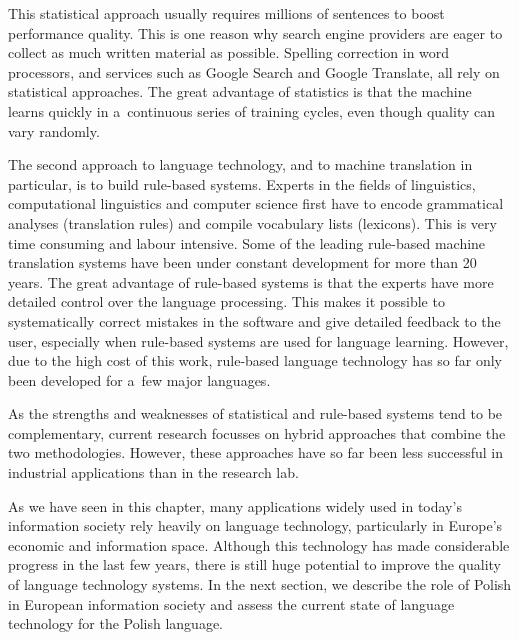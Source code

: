 \begin{multicols}{2}
This statistical approach usually requires millions of sentences to
boost performance quality. This is one reason why search engine
providers are eager to collect as much written material as possible.
Spelling correction in word processors, and services such as Google
Search and Google Translate, all rely on statistical approaches. The
great advantage of statistics is that the machine learns quickly in
a~continuous series of training cycles, even though quality can vary
randomly. 

The second approach to language technology, and to machine translation
in particular, is to build rule-based systems. Experts in the fields
of linguistics, computational linguistics and computer science first
have to encode grammatical analyses (translation rules) and compile
vocabulary lists (lexicons). This is very time consuming and labour
intensive. Some of the leading rule-based machine translation systems
have been under constant development for more than 20 years. The great
advantage of rule-based systems is that the experts have more detailed
control over the language processing. This makes it possible to
systematically correct mistakes in the software and give detailed
feedback to the user, especially when rule-based systems are used for
language learning. However, due to the high cost of this work,
rule-based language technology has so far only been developed for
a~few major languages. 


As the strengths and weaknesses of statistical and rule-based systems
tend to be complementary, current research focusses on hybrid
approaches that combine the two methodologies. However, these
approaches have so far been less successful in industrial applications
than in the research lab. 

As we have seen in this chapter, many applications widely used in
today’s information society rely heavily on language technology,
particularly in Europe’s economic and information space. Although
this technology has made considerable progress in the last few years,
there is still huge potential to improve the quality of language
technology systems. In the next section, we describe the role of
Polish in European information society and assess the current state of
language technology for the Polish language. \end{multicols} 

\clearpage 

